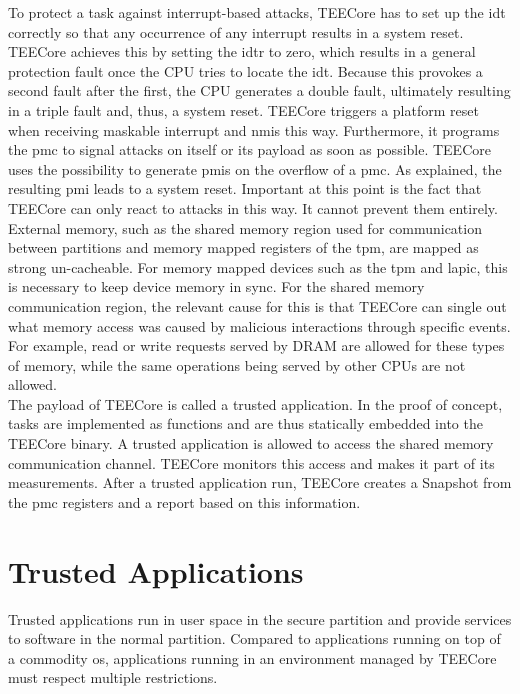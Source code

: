 To protect a task against interrupt-based attacks, TEECore has to set up the
\gls{idt} correctly so that any occurrence of any interrupt results in a system
reset. TEECore achieves this by setting the \gls{idtr} to zero, which results in
a general protection fault once the CPU tries to locate the \gls{idt}. Because
this provokes a second fault after the first, the CPU generates a double fault,
ultimately resulting in a triple fault and, thus, a system reset. TEECore
triggers a platform reset when receiving maskable interrupt and \glspl{nmi} this
way. Furthermore, it programs the \gls{pmc} to signal attacks on itself or its
payload as soon as possible. TEECore uses the possibility to generate
\glspl{pmi} on the overflow of a \gls{pmc}. As explained, the resulting
\gls{pmi} leads to a system reset. Important at this point is the fact that
TEECore can only react to attacks in this way. It cannot prevent them
entirely.\\

External memory, such as the shared memory region used for communication between
partitions and memory mapped registers of the \gls{tpm}, are mapped as strong
un-cacheable. For memory mapped devices such as the \gls{tpm} and \gls{lapic},
this is necessary to keep device memory in sync. For the shared memory
communication region, the relevant cause for this is that TEECore can
single out what memory access was caused by malicious interactions through
specific events. For example, read or write requests served by DRAM are allowed
for these types of memory, while the same operations being served by other CPUs
are not allowed.\\

The payload of TEECore is called a trusted application. In the proof of concept,
tasks are implemented as functions and are thus statically embedded into the
TEECore binary. A trusted application is allowed to access the shared memory
communication channel. TEECore monitors this access and makes it part of its
measurements. After a trusted application run, TEECore creates a Snapshot from
the \gls{pmc} registers and a report based on this information.

\section{Trusted Applications}
\label{sec:30:tee_apps}
Trusted applications run in user space in the secure partition and provide
services to software in the normal partition. Compared to applications running
on top of a commodity \gls{os}, applications running in an environment managed
by TEECore must respect multiple restrictions.\\

